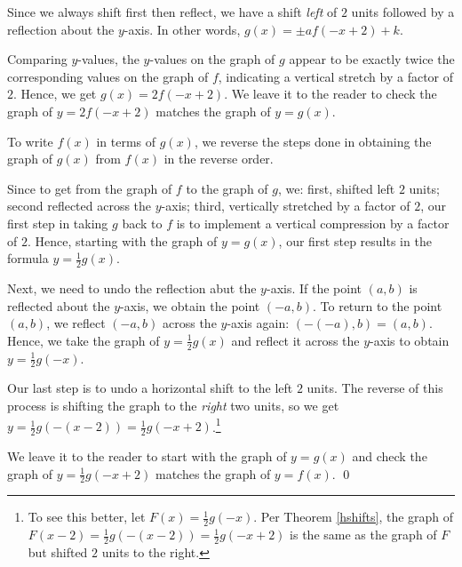 \documentclass{ximera}
\begin{document}
\begin{example}
\begin{enumerate}
 \smallskip
 
 Since we always shift first then reflect, we have a shift \textit{left} of $2$ units followed by a reflection about the $y$-axis.  In other words, $g(x) = \pm a f(-x+2) + k$.  
 
 \smallskip
 
 Comparing $y$-values, the $y$-values on the graph of $g$ appear to be exactly twice the corresponding values on the graph of $f$, indicating a vertical stretch by a factor of $2$.  Hence, we get $g(x) = 2 f(-x+2)$.  We leave it to the reader to check the graph of $y=2f(-x+2)$ matches the graph of $y=g(x)$.  
 
 \smallskip
 
To write $f(x)$ in terms of $g(x)$, we reverse the steps done in obtaining the graph of $g(x)$ from $f(x)$ in the reverse order.  

\smallskip

Since to get from the graph of $f$ to the graph of $g$, we: first, shifted left $2$ units; second reflected across the $y$-axis; third, vertically stretched by a factor of $2$, our first step in taking $g$ back to $f$ is to implement a vertical compression by a factor of $2$.  Hence, starting with the graph of $y=g(x)$, our first step results in the formula $y = \frac{1}{2} g(x)$. 

\smallskip

 Next, we need to undo the reflection abut the $y$-axis.  If the point $(a,b)$ is reflected about the $y$-axis, we obtain the point $(-a,b)$.  To return to the point $(a,b)$, we reflect $(-a,b)$ across the $y$-axis again: $(-(-a),b) = (a,b)$.  Hence, we take the graph of $y = \frac{1}{2} g(x)$ and reflect it across the $y$-axis to obtain $y = \frac{1}{2} g(-x)$.  
 
 \smallskip
 
 Our last step is to undo a horizontal shift to the left $2$ units.  The reverse of this process is shifting the graph to the \textit{right} two units, so we get $y = \frac{1}{2} g(-(x-2)) = \frac{1}{2} g(-x+2)$.\footnote{To see this better, let $F(x) = \frac{1}{2} g(-x)$.  Per Theorem \ref{hshifts}, the graph of  $F(x-2) = \frac{1}{2} g(-(x-2)) = \frac{1}{2} g(-x+2)$ is the same as the graph of $F$ but shifted $2$ units to the right.}  
 
 \smallskip
 
 We leave it to the reader to start with the graph of $y=g(x)$ and check the graph of $y =  \frac{1}{2} g(-x+2)$ matches the graph of $y = f(x)$. \qed

\end{enumerate}

\end{example}
\end{document}

